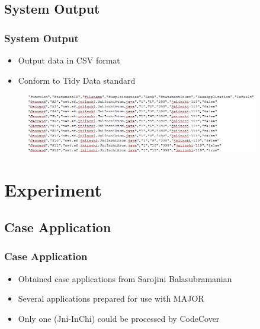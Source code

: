 \documentclass{beamer}
\begin{document}
	\subsection{System Output}
	\begin{frame}
	\frametitle{System Output}
	\begin{itemize}
		\item Output data in CSV format
		\pause
		\item Conform to Tidy Data standard
		\pause
	\end{itemize}
	
	\begin{figure}
		\label{out}
		\includegraphics[width=4in]{img/output}
	\end{figure}
	
	\end{frame}
	\section{Experiment}
	\subsection{Case Application}
	\begin{frame}
	\frametitle{Case Application}
	\begin{itemize}
		\item Obtained case applications from Sarojini Balasubramanian
		\pause
		\item Several applications prepared for use with MAJOR
		\pause
		\item Only one (Jni-InChi) could be processed by CodeCover
	\end{itemize}
	\end{frame}
\end{document}
